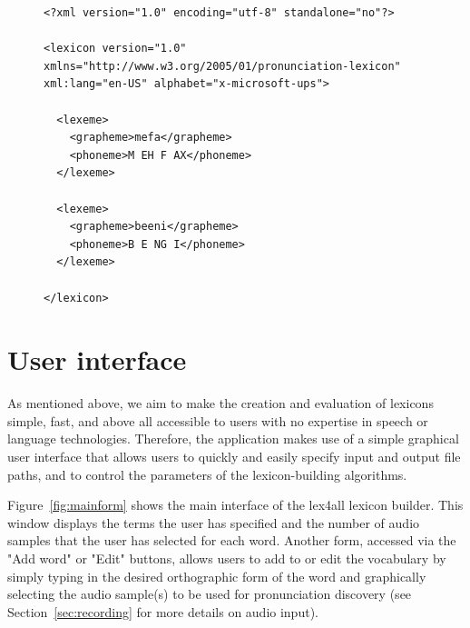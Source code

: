 \documentclass[11pt]{article}
\begin{document}
\begin{figure}
\begin{lstlisting}[caption=Sample lexicon file mapping Yoruba words to American English pronunciations., label=lst:lexicon]
<?xml version="1.0" encoding="utf-8" standalone="no"?>
	  
<lexicon version="1.0" xmlns="http://www.w3.org/2005/01/pronunciation-lexicon" xml:lang="en-US" alphabet="x-microsoft-ups">
		 
  <lexeme>
    <grapheme>mefa</grapheme>
    <phoneme>M EH F AX</phoneme>
  </lexeme>
  
  <lexeme>
    <grapheme>beeni</grapheme>
    <phoneme>B E NG I</phoneme>
  </lexeme>
  
</lexicon>
\end{lstlisting}
\end{figure}







\section{User interface}
\label{sec:frontend}

As mentioned above, we aim to make the creation and evaluation of lexicons simple, fast, and above all accessible to users with no expertise in speech or language technologies. Therefore, the application makes use of a simple graphical user interface that allows users to quickly and easily specify input and output file paths, and to control the parameters of the lexicon-building algorithms. 

Figure~\ref{fig:mainform} shows the main interface of the lex4all lexicon builder. This window displays the terms the user has specified and the number of audio samples that the user has selected for each word. Another form, accessed via the "Add word" or "Edit" buttons, allows users to add to or edit the vocabulary by simply typing in the desired orthographic form of the word and graphically selecting the audio sample(s) to be used for pronunciation discovery (see Section~\ref{sec:recording} for more details on audio input).
\end{document}
